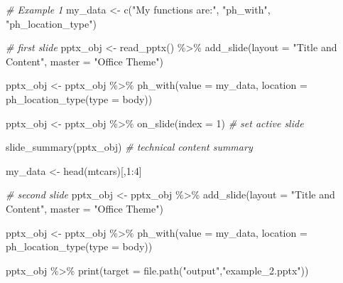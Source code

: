 \documentclass[
]{book}
\newenvironment{Shaded}{\begin{snugshade}}{\end{snugshade}}
\newcommand{\AttributeTok}[1]{\textcolor[rgb]{0.77,0.63,0.00}{#1}}
\newcommand{\CommentTok}[1]{\textcolor[rgb]{0.56,0.35,0.01}{\textit{#1}}}
\newcommand{\DecValTok}[1]{\textcolor[rgb]{0.00,0.00,0.81}{#1}}
\newcommand{\FunctionTok}[1]{\textcolor[rgb]{0.00,0.00,0.00}{#1}}
\newcommand{\NormalTok}[1]{#1}
\newcommand{\OtherTok}[1]{\textcolor[rgb]{0.56,0.35,0.01}{#1}}
\newcommand{\SpecialCharTok}[1]{\textcolor[rgb]{0.00,0.00,0.00}{#1}}
\newcommand{\StringTok}[1]{\textcolor[rgb]{0.31,0.60,0.02}{#1}}
\begin{document}
\begin{Shaded}
\begin{Highlighting}[]
\CommentTok{\# Example 1}
\NormalTok{my\_data }\OtherTok{\textless{}{-}} \FunctionTok{c}\NormalTok{(}\StringTok{"My functions are:"}\NormalTok{, }\StringTok{"ph\_with"}\NormalTok{, }\StringTok{"ph\_location\_type"}\NormalTok{)}

\CommentTok{\# first slide}
\NormalTok{pptx\_obj }\OtherTok{\textless{}{-}} \FunctionTok{read\_pptx}\NormalTok{() }\SpecialCharTok{\%\textgreater{}\%}
  \FunctionTok{add\_slide}\NormalTok{(}\AttributeTok{layout =} \StringTok{"Title and Content"}\NormalTok{, }\AttributeTok{master =} \StringTok{"Office Theme"}\NormalTok{)}

\NormalTok{pptx\_obj }\OtherTok{\textless{}{-}}\NormalTok{ pptx\_obj }\SpecialCharTok{\%\textgreater{}\%}
  \FunctionTok{ph\_with}\NormalTok{(}\AttributeTok{value =}\NormalTok{ my\_data, }\AttributeTok{location =} \FunctionTok{ph\_location\_type}\NormalTok{(}\AttributeTok{type =} \StringTok{\textquotesingle{}body\textquotesingle{}}\NormalTok{))}

\NormalTok{pptx\_obj }\OtherTok{\textless{}{-}}\NormalTok{ pptx\_obj }\SpecialCharTok{\%\textgreater{}\%} 
  \FunctionTok{on\_slide}\NormalTok{(}\AttributeTok{index =} \DecValTok{1}\NormalTok{) }\CommentTok{\# set active slide}

\FunctionTok{slide\_summary}\NormalTok{(pptx\_obj) }\CommentTok{\# technical content summary}

\NormalTok{my\_data }\OtherTok{\textless{}{-}} \FunctionTok{head}\NormalTok{(mtcars)[,}\DecValTok{1}\SpecialCharTok{:}\DecValTok{4}\NormalTok{]}

\CommentTok{\# second slide}
\NormalTok{pptx\_obj }\OtherTok{\textless{}{-}}\NormalTok{ pptx\_obj }\SpecialCharTok{\%\textgreater{}\%} 
    \FunctionTok{add\_slide}\NormalTok{(}\AttributeTok{layout =} \StringTok{"Title and Content"}\NormalTok{, }\AttributeTok{master =} \StringTok{"Office Theme"}\NormalTok{)}

\NormalTok{pptx\_obj }\OtherTok{\textless{}{-}}\NormalTok{ pptx\_obj }\SpecialCharTok{\%\textgreater{}\%} 
  \FunctionTok{ph\_with}\NormalTok{(}\AttributeTok{value =}\NormalTok{ my\_data, }\AttributeTok{location =} \FunctionTok{ph\_location\_type}\NormalTok{(}\AttributeTok{type =} \StringTok{\textquotesingle{}body\textquotesingle{}}\NormalTok{)) }

\NormalTok{pptx\_obj }\SpecialCharTok{\%\textgreater{}\%}
  \FunctionTok{print}\NormalTok{(}\AttributeTok{target =} \FunctionTok{file.path}\NormalTok{(}\StringTok{"output"}\NormalTok{,}\StringTok{"example\_2.pptx"}\NormalTok{))}
\end{Highlighting}
\end{Shaded}
\end{document}
